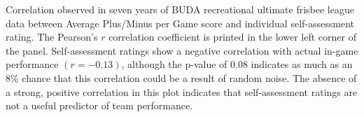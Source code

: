 Correlation observed in seven years of BUDA recreational ultimate frisbee league data between Average Plus/Minus per Game score and individual self-assessment rating. The Pearson's $r$ correlation coefficient is printed in the lower left corner of the panel. Self-assessment ratings show a negative correlation with actual in-game performance $(r = -0.13)$, although the p-value of 0.08 indicates as much as an 8\% chance that this correlation could be a result of random noise. The absence of a strong, positive correlation in this plot indicates that self-assessment ratings are not a useful predictor of team performance. \label{fig:correlation_self}